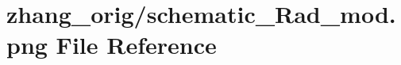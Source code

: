 \hypertarget{schematic___rad__mod_8png}{}\section{zhang\+\_\+orig/schematic\+\_\+\+Rad\+\_\+mod.png File Reference}
\label{schematic___rad__mod_8png}
